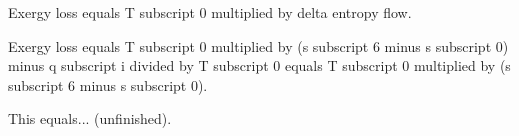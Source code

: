 Exergy loss equals T subscript 0 multiplied by delta entropy flow.  

Exergy loss equals T subscript 0 multiplied by (s subscript 6 minus s subscript 0) minus q subscript i divided by T subscript 0 equals T subscript 0 multiplied by (s subscript 6 minus s subscript 0).  

This equals... (unfinished).